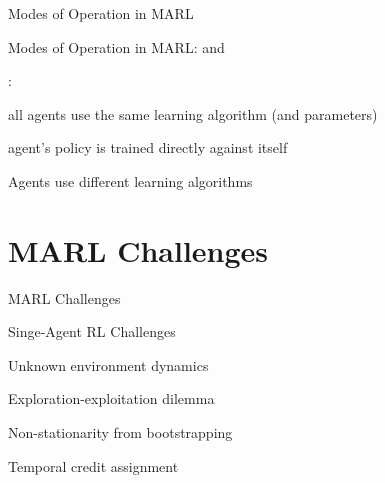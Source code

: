 \begin{frame}{Modes of Operation in MARL}

Modes of Operation in MARL:  and 

\vspace{10pt}

:
\blist
    \item {} all agents use the same learning algorithm (and parameters)
    \item {} agent's policy is trained directly against itself
\elist

\vspace{5pt}

\blist
    \item Agents use different learning algorithms
\elist
    
\end{frame}

\section{MARL Challenges}

\begin{frame}{MARL Challenges}

\small 

\bcol
		\begin{custombox}{Singe-Agent RL Challenges}
		\blist
		    \item Unknown environment dynamics
		    \item Exploration-exploitation dilemma
		    \item Non-stationarity from bootstrapping
		    \item Temporal credit assignment
		\elist
		\end{custombox}
		
\ecol    
\end{frame}

